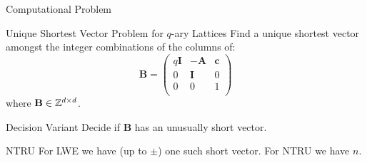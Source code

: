 \documentclass[table,10pt,aspectratio=169]{beamer}
\renewcommand{\vec}[1]{\ensuremath{\mathbf{#1}}\xspace}
\providecommand{\mat}[1]{\ensuremath{\vec{#1}}\xspace}
\begin{document}
\begin{frame}[label={sec:orgf075c30}]{Computational Problem}
\begin{block}{Unique Shortest Vector Problem for \(q\)-ary Lattices}
Find a unique shortest vector amongst the integer combinations of the columns of:
\[
  \mat{B} = \begin{pmatrix}
 q\mat{I} & -\mat{A} & \vec{c}\\
 0        & \mat{I}  & 0\\
 0        & 0        & 1\\
  \end{pmatrix}
\]
where \(\mat{B} \in \ZZ^{d \times d}\).
\end{block}

\begin{block}{Decision Variant}
Decide if \(\mat{B}\) has an unusually short vector.

\pause
\end{block}

\begin{alertblock}{NTRU}
For LWE we have (up to \(\pm\)) one such short vector. For NTRU we have \(n\).
\end{alertblock}
\end{frame}
\end{document}

